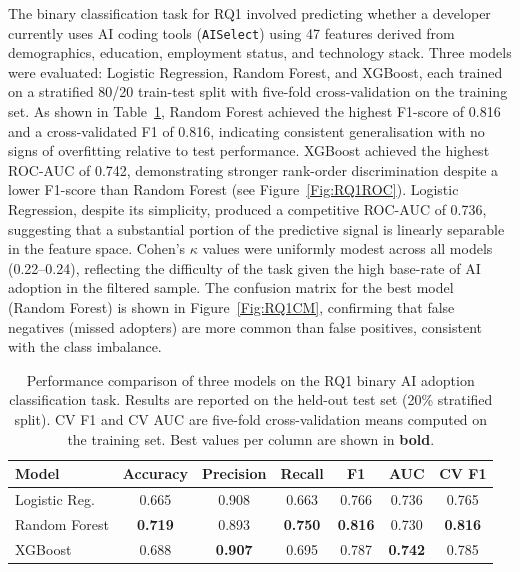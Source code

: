 \documentclass[journal, onecolumn]{IEEEtran}
\begin{document}
The binary classification task for RQ1 involved predicting whether a developer currently uses AI coding tools (\texttt{AISelect}) using 47 features derived from demographics, education, employment status, and technology stack.
Three models were evaluated: Logistic Regression, Random Forest, and XGBoost, each trained on a stratified 80/20 train-test split with five-fold cross-validation on the training set.
As shown in Table~\ref{tab:RQ1Models}, Random Forest achieved the highest F1-score of 0.816 and a cross-validated F1 of 0.816, indicating consistent generalisation with no signs of overfitting relative to test performance.
XGBoost achieved the highest ROC-AUC of 0.742, demonstrating stronger rank-order discrimination despite a lower F1-score than Random Forest (see Figure~\ref{Fig:RQ1ROC}).
Logistic Regression, despite its simplicity, produced a competitive ROC-AUC of 0.736, suggesting that a substantial portion of the predictive signal is linearly separable in the feature space.
Cohen's $\kappa$ values were uniformly modest across all models (0.22--0.24), reflecting the difficulty of the task given the high base-rate of AI adoption in the filtered sample.
The confusion matrix for the best model (Random Forest) is shown in Figure~\ref{Fig:RQ1CM}, confirming that false negatives (missed adopters) are more common than false positives, consistent with the class imbalance.

\begin{table}[!ht]
\centering
\caption{Performance comparison of three models on the RQ1 binary AI adoption classification task. Results are reported on the held-out test set (20\% stratified split). CV F1 and CV AUC are five-fold cross-validation means computed on the training set. Best values per column are shown in \textbf{bold}.}
\label{tab:RQ1Models}
\begin{tabular}{|l|c|c|c|c|c|c|}
\hline
\textbf{Model} & \textbf{Accuracy} & \textbf{Precision} & \textbf{Recall} & \textbf{F1} & \textbf{AUC} & \textbf{CV F1} \\ \hline
Logistic Reg. & 0.665 & 0.908 & 0.663 & 0.766 & 0.736 & 0.765 \\ \hline
Random Forest & \textbf{0.719} & 0.893 & \textbf{0.750} & \textbf{0.816} & 0.730 & \textbf{0.816} \\ \hline
XGBoost & 0.688 & \textbf{0.907} & 0.695 & 0.787 & \textbf{0.742} & 0.785 \\ \hline
\end{tabular}
\end{table}
\end{document}
